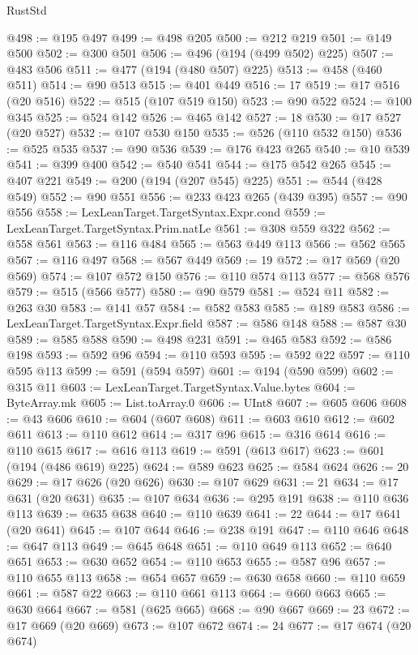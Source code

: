 \begin{lexlean}{RustStd}
\begin{coremodule}
@498 := @195 @497
@499 := @498 @205
@500 := @212 @219
@501 := @149 @500
@502 := @300 @501
@506 := @496 (@194 (@499 @502) @225)
@507 := @483 @506
@511 := @477 (@194 (@480 @507) @225)
@513 := @458 (@460 @511)
@514 := @90 @513
@515 := @401 @449
@516 := 17
@519 := @17 @516 (@20 @516)
@522 := @515 (@107 @519 @150)
@523 := @90 @522
@524 := @100 @345
@525 := @524 @142
@526 := @465 @142
@527 := 18
@530 := @17 @527 (@20 @527)
@532 := @107 @530 @150
@535 := @526 (@110 @532 @150)
@536 := @525 @535
@537 := @90 @536
@539 := @176 @423 @265
@540 := @10 @539
@541 := @399 @400
@542 := @540 @541
@544 := @175 @542 @265
@545 := @407 @221
@549 := @200 (@194 (@207 @545) @225)
@551 := @544 (@428 @549)
@552 := @90 @551
@556 := @233 @423 @265 (@439 @395)
@557 := @90 @556
@558 := LexLeanTarget.TargetSyntax.Expr.cond
@559 := LexLeanTarget.TargetSyntax.Prim.natLe
@561 := @308 @559 @322
@562 := @558 @561
@563 := @116 @484
@565 := @563 @449 @113
@566 := @562 @565
@567 := @116 @497
@568 := @567 @449
@569 := 19
@572 := @17 @569 (@20 @569)
@574 := @107 @572 @150
@576 := @110 @574 @113
@577 := @568 @576
@579 := @515 (@566 @577)
@580 := @90 @579
@581 := @524 @11
@582 := @263 @30
@583 := @141 @57
@584 := @582 @583
@585 := @189 @583
@586 := LexLeanTarget.TargetSyntax.Expr.field
@587 := @586 @148
@588 := @587 @30
@589 := @585 @588
@590 := @498 @231
@591 := @465 @583
@592 := @586 @198
@593 := @592 @96
@594 := @110 @593
@595 := @592 @22
@597 := @110 @595 @113
@599 := @591 (@594 @597)
@601 := @194 (@590 @599)
@602 := @315 @11
@603 := LexLeanTarget.TargetSyntax.Value.bytes
@604 := ByteArray.mk
@605 := List.toArray.{0}
@606 := UInt8
@607 := @605 @606
@608 := @43 @606
@610 := @604 (@607 @608)
@611 := @603 @610
@612 := @602 @611
@613 := @110 @612
@614 := @317 @96
@615 := @316 @614
@616 := @110 @615
@617 := @616 @113
@619 := @591 (@613 @617)
@623 := @601 (@194 (@486 @619) @225)
@624 := @589 @623
@625 := @584 @624
@626 := 20
@629 := @17 @626 (@20 @626)
@630 := @107 @629
@631 := 21
@634 := @17 @631 (@20 @631)
@635 := @107 @634
@636 := @295 @191
@638 := @110 @636 @113
@639 := @635 @638
@640 := @110 @639
@641 := 22
@644 := @17 @641 (@20 @641)
@645 := @107 @644
@646 := @238 @191
@647 := @110 @646
@648 := @647 @113
@649 := @645 @648
@651 := @110 @649 @113
@652 := @640 @651
@653 := @630 @652
@654 := @110 @653
@655 := @587 @96
@657 := @110 @655 @113
@658 := @654 @657
@659 := @630 @658
@660 := @110 @659
@661 := @587 @22
@663 := @110 @661 @113
@664 := @660 @663
@665 := @630 @664
@667 := @581 (@625 @665)
@668 := @90 @667
@669 := 23
@672 := @17 @669 (@20 @669)
@673 := @107 @672
@674 := 24
@677 := @17 @674 (@20 @674)

\end{coremodule}
\end{lexlean}
